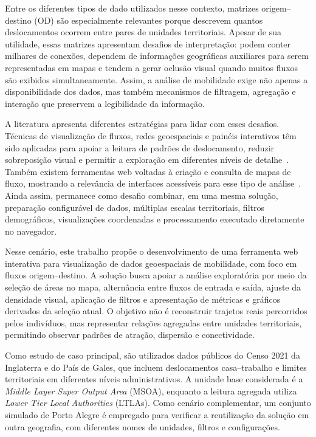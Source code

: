\documentclass[12pt]{article}
\begin{document}
Entre os diferentes tipos de dado utilizados nesse contexto, matrizes origem--destino (OD) são especialmente relevantes porque descrevem quantos deslocamentos ocorrem entre pares de unidades territoriais. Apesar de sua utilidade, essas matrizes apresentam desafios de interpretação: podem conter milhares de conexões, dependem de informações geográficas auxiliares para serem representadas em mapas e tendem a gerar oclusão visual quando muitos fluxos são exibidos simultaneamente. Assim, a análise de mobilidade exige não apenas a disponibilidade dos dados, mas também mecanismos de filtragem, agregação e interação que preservem a legibilidade da informação.

A literatura apresenta diferentes estratégias para lidar com esses desafios. Técnicas de visualização de fluxos, redes geoespaciais e painéis interativos têm sido aplicadas para apoiar a leitura de padrões de deslocamento, reduzir sobreposição visual e permitir a exploração em diferentes níveis de detalhe~\cite{Wood01052010,Dodge04072021,schottler2021visualizing}. Também existem ferramentas web voltadas à criação e consulta de mapas de fluxo, mostrando a relevância de interfaces acessíveis para esse tipo de análise~\cite{koylu2021flowmapper,li2020odtflowexplorer}. Ainda assim, permanece como desafio combinar, em uma mesma solução, preparação configurável de dados, múltiplas escalas territoriais, filtros demográficos, visualizações coordenadas e processamento executado diretamente no navegador.

Nesse cenário, este trabalho propõe o desenvolvimento de uma ferramenta web interativa para visualização de dados geoespaciais de mobilidade, com foco em fluxos origem--destino. A solução busca apoiar a análise exploratória por meio da seleção de áreas no mapa, alternância entre fluxos de entrada e saída, ajuste da densidade visual, aplicação de filtros e apresentação de métricas e gráficos derivados da seleção atual. O objetivo não é reconstruir trajetos reais percorridos pelos indivíduos, mas representar relações agregadas entre unidades territoriais, permitindo observar padrões de atração, dispersão e conectividade.

Como estudo de caso principal, são utilizados dados públicos do Censo 2021 da Inglaterra e do País de Gales, que incluem deslocamentos casa--trabalho e limites territoriais em diferentes níveis administrativos. A unidade base considerada é a \textit{Middle Layer Super Output Area} (MSOA), enquanto a leitura agregada utiliza \textit{Lower Tier Local Authorities} (LTLAs). Como cenário complementar, um conjunto simulado de Porto Alegre é empregado para verificar a reutilização da solução em outra geografia, com diferentes nomes de unidades, filtros e configurações.
\end{document}
